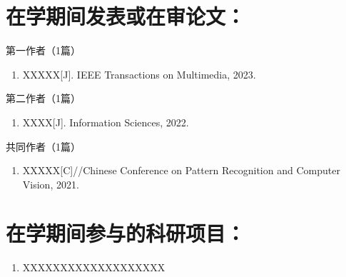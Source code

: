 \documentclass[doctor]{thesis}
\begin{document}
\begin{thesisAccomplish}
    \section*{\heiti\fontsize{14pt}{16.8pt}\selectfont 在学期间发表或在审论文：} 
    \hspace{-26pt} 第一作者（1篇）
    \begin{enumerate}[labelindent=0pt, leftmargin=*]
        \item XXXXX[J]. 
        IEEE Transactions on Multimedia, 2023.
    \end{enumerate}
    第二作者（1篇）
    \begin{enumerate}[labelindent=0pt, leftmargin=*]
        \item XXXX[J]. 
        Information Sciences, 2022.
    \end{enumerate}
    共同作者（1篇）
    \begin{enumerate}[labelindent=0pt, leftmargin=*]
        \item XXXXX[C]//Chinese Conference on Pattern Recognition and Computer Vision, 2021.
    \end{enumerate}

    \section*{\heiti\fontsize{14pt}{16.8pt}\selectfont 在学期间参与的科研项目：} 
    \begin{enumerate}[labelindent=0pt, leftmargin=*]
        \item XXXXXXXXXXXXXXXXXXX
    \end{enumerate}
\end{thesisAccomplish}
\end{document}
